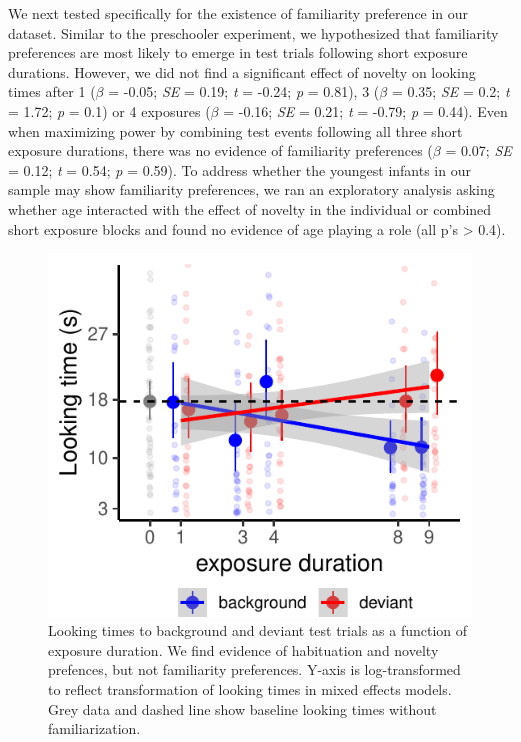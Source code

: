 \documentclass[10pt, letterpaper]{article}
\newenvironment{CodeChunk}{}{}
\begin{document}
We next tested specifically for the existence of familiarity preference
in our dataset. Similar to the preschooler experiment, we hypothesized
that familiarity preferences are most likely to emerge in test trials
following short exposure durations. However, we did not find a
significant effect of novelty on looking times after 1 (\(\beta\) =
-0.05; \emph{SE} = 0.19; \emph{t} = -0.24; \emph{p} = 0.81), 3
(\(\beta\) = 0.35; \emph{SE} = 0.2; \emph{t} = 1.72; \emph{p} = 0.1) or
4 exposures (\(\beta\) = -0.16; \emph{SE} = 0.21; \emph{t} = -0.79;
\emph{p} = 0.44). Even when maximizing power by combining test events
following all three short exposure durations, there was no evidence of
familiarity preferences (\(\beta\) = 0.07; \emph{SE} = 0.12; \emph{t} =
0.54; \emph{p} = 0.59). To address whether the youngest infants in our
sample may show familiarity preferences, we ran an exploratory analysis
asking whether age interacted with the effect of novelty in the
individual or combined short exposure blocks and found no evidence of
age playing a role (all p's \textgreater{} 0.4).

\captionsetup{belowskip=0pt,aboveskip=4pt}

\begin{CodeChunk}
\begin{figure}[h]

\includegraphics{figs/infant_results-1} \hfill{}

\caption[Looking times to background and deviant test trials as a function of exposure duration]{Looking times to background and deviant test trials as a function of exposure duration. We find evidence of habituation and novelty prefences, but not familiarity preferences. Y-axis is log-transformed to reflect transformation of looking times in mixed effects models. Grey data and dashed line show baseline looking times without familiarization.}\label{fig:infant_results}
\end{figure}
\end{CodeChunk}
\end{document}
